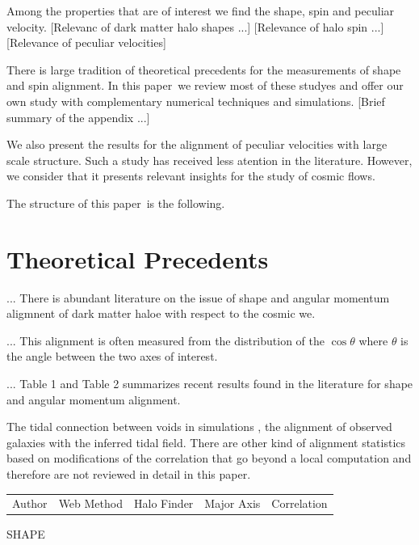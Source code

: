 \documentclass[usenatbib]{mn2e}
\newcommand{\documentname}{paper~}
\begin{document}
Among the properties that are of interest we find the shape, spin and
peculiar velocity. [Relevanc of dark matter halo shapes ...]
[Relevance of halo spin ...] [Relevance of peculiar velocities]

There is large tradition of theoretical precedents for the
measurements of shape and spin alignment. In this \documentname we
review most of these studyes and offer our own study with
complementary numerical techniques and simulations. [Brief summary of
  the appendix ...]

We also present the results for the alignment of peculiar velocities
with large scale structure. Such a study has received less atention in
the literature. However, we consider that it presents relevant
insights for the study of cosmic flows.

The structure of this \documentname is the following.


\section{Theoretical Precedents}
\label{sec:theory}

... There is abundant literature on the issue of shape and angular momentum
aligmnent of dark matter haloe with respect to the cosmic we.

... This alignment is often measured from the distribution of the
$\cos\theta$ where $\theta$ is the angle between the two axes of
interest.

... Table 1 and Table 2 summarizes recent results found in the literature for
shape and angular momentum alignment. 

The tidal connection between voids in simulations \citep{Platen2008},
the alignment of observed galaxies with the inferred tidal
field\citep{Lee2007,Jones2010}. There are other kind of alignment
statistics based on modifications of the correlation
\citep{Paz2008,Faltenbacher2009} that go beyond a local computation
and therefore are not reviewed in detail in this paper.


\begin{table}
\begin{tabular}{lllll}
Author & Web Method & Halo Finder & Major Axis & Correlation\\
\end{tabular}
SHAPE
\end{table}
\end{document}
